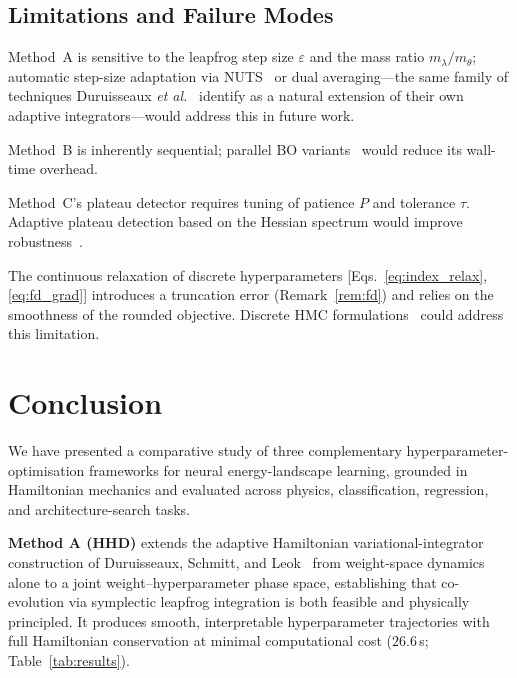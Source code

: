 \documentclass[11pt]{article}
\theoremstyle{definition}
\begin{document}
\subsection{Limitations and Failure Modes}

Method~A is sensitive to the leapfrog step size $\varepsilon$ and the
mass ratio $m_\lambda/m_\theta$; automatic step-size adaptation via
NUTS~\cite{hoffman2014nuts} or dual averaging---the same family of
techniques Duruisseaux \emph{et al.}~\cite{duruisseaux2021adaptive}
identify as a natural extension of their own adaptive
integrators---would address this in future work.

Method~B is inherently sequential; parallel BO
variants~\cite{shahriari2016bo} would reduce its wall-time overhead.

Method~C's plateau detector requires tuning of patience $P$ and
tolerance $\tau$. Adaptive plateau detection based on the Hessian
spectrum would improve robustness~\cite{rathore2024,dobson2025connections}.

The continuous relaxation of discrete hyperparameters
[Eqs.~\eqref{eq:index_relax}, \eqref{eq:fd_grad}] introduces a
truncation error (Remark~\ref{rem:fd}) and relies on the smoothness
of the rounded objective. Discrete HMC formulations~\cite{neal2011}
could address this limitation.


\section{Conclusion}

We have presented a comparative study of three complementary
hyperparameter-optimisation frameworks for neural energy-landscape
learning, grounded in Hamiltonian mechanics and evaluated across
physics, classification, regression, and architecture-search tasks.

\textbf{Method A (HHD)} extends the adaptive Hamiltonian
variational-integrator construction of Duruisseaux, Schmitt, and
Leok~\cite{duruisseaux2021adaptive} from weight-space dynamics alone
to a joint weight--hyperparameter phase space, establishing that
co-evolution via symplectic leapfrog integration is both feasible and
physically principled. It produces smooth, interpretable
hyperparameter trajectories with full Hamiltonian conservation at
minimal computational cost ($26.6$\,s; Table~\ref{tab:results}).
\end{document}
